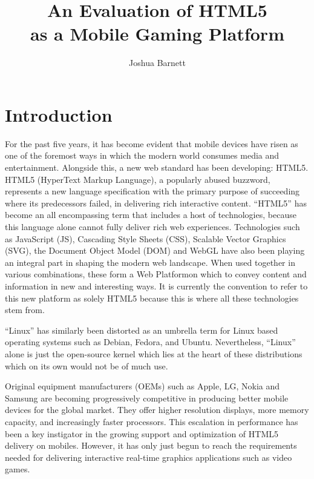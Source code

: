 \documentclass[final]{cmpreport}
\title{An Evaluation of HTML5\\as a Mobile Gaming Platform}
\author{Joshua Barnett}
\begin{document}
\section{Introduction}
For the past five years, it has become evident that mobile devices have risen as one of the foremost ways in which the modern world consumes media and entertainment. Alongside this, a new web standard has been developing: HTML5. HTML5 (HyperText Markup Language), a popularly abused buzzword, represents a new language specification with the primary purpose of succeeding where its predecessors failed, in delivering rich interactive content. ``HTML5'' has become an all encompassing term that includes a host of technologies, because this language alone cannot fully deliver rich web experiences. Technologies such as JavaScript (JS), Cascading Style Sheets (CSS), Scalable Vector Graphics (SVG), the Document Object Model (DOM) and WebGL have also been playing an integral part in shaping the modern web landscape. When used together in various combinations, these form a Web Platform\footnotemark on which to convey content and information in new and interesting ways. It is currently the convention to refer to this new platform as solely HTML5 because this is where all these technologies stem from.


``Linux'' has similarly been distorted as an umbrella term for Linux based operating systems such as Debian, Fedora, and Ubuntu. Nevertheless, ``Linux'' alone is just the open-source kernel which lies at the heart of these distributions which on its own would not be of much use.

Original equipment manufacturers (OEMs) such as Apple, LG, Nokia and Samsung are becoming progressively competitive in producing better mobile devices for the global market. They offer higher resolution displays, more memory capacity, and increasingly faster processors. This escalation in performance has been a key instigator in the growing support and optimization of HTML5 delivery on mobiles. However, it has only just begun to reach the requirements needed for delivering interactive real-time graphics applications such as video games.
\end{document}
